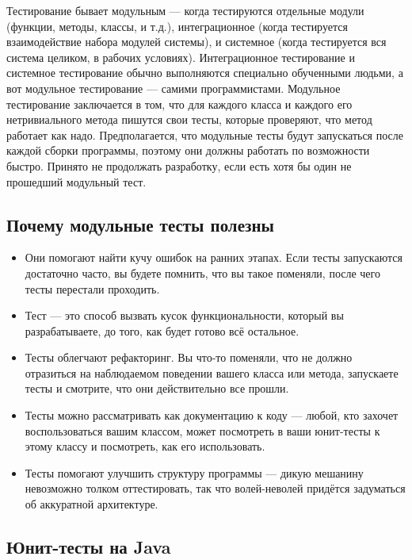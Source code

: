 \documentclass[a5paper]{article}
\begin{document}
Тестирование бывает модульным --- когда тестируются отдельные модули (функции, методы, классы, и т.д.), интеграционное (когда тестируется взаимодействие набора модулей системы), и системное (когда тестируется вся система целиком, в рабочих условиях). Интеграционное тестирование и системное тестирование обычно выполняются специально обученными людьми, а вот модульное тестирование --- самими программистами. Модульное тестирование заключается в том, что для каждого класса и каждого его нетривиального метода пишутся свои тесты, которые проверяют, что метод работает как надо. Предполагается, что модульные тесты будут запускаться после каждой сборки программы, поэтому они должны работать по возможности быстро. Принято не продолжать разработку, если есть хотя бы один не прошедший модульный тест.

\subsection{Почему модульные тесты полезны}

\begin{itemize}
	\item Они помогают найти кучу ошибок на ранних этапах. Если тесты запускаются достаточно часто, вы будете помнить, что вы такое поменяли, после чего тесты перестали проходить.
	\item Тест --- это способ вызвать кусок функциональности, который вы разрабатываете, до того, как будет готово всё остальное.
	\item Тесты облегчают рефакторинг. Вы что-то поменяли, что не должно отразиться на наблюдаемом поведении вашего класса или метода, запускаете тесты и смотрите, что они действительно все прошли. 
	\item Тесты можно рассматривать как документацию к коду --- любой, кто захочет воспользоваться вашим классом, может посмотреть в ваши юнит-тесты к этому классу и посмотреть, как его использовать.
	\item Тесты помогают улучшить структуру программы --- дикую мешанину невозможно толком оттестировать, так что волей-неволей придётся задуматься об аккуратной архитектуре.
\end{itemize}

\subsection{Юнит-тесты на Java}
\end{document}
